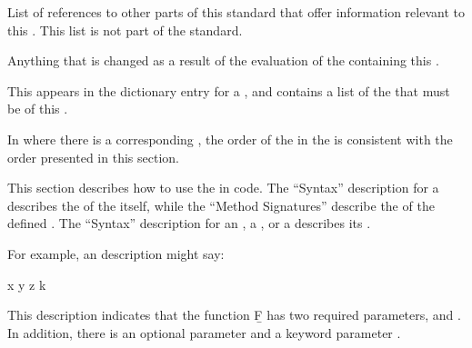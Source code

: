 \endsubsubsection%


List of references to other parts of this standard
that offer information relevant to this . 
This list is not part of the standard.
         
\endsubsubsection%


Anything that is changed as a result of the
evaluation of the  containing this .

\endsubsubsection%


This appears in the dictionary entry for a ,
and contains a list of the   
that must be  of this .

In  where there is a corresponding ,
the order of the  in the  
is consistent with the order presented in this section.

\endsubsubsection%


This section describes how to use the  in code.
The ``Syntax'' description for a  
describes the  of the  itself, 
while the ``Method Signatures'' describe the  
of the defined .
The ``Syntax'' description for 
     an ,
     a ,
  or a 
describes its .

For example, an  description might say:

 {x y {\opt} z {\key} k}

\noindent This description indicates that the function \b{F} 
has two required parameters,  and .  In addition,
there is an optional parameter  and a keyword parameter .

